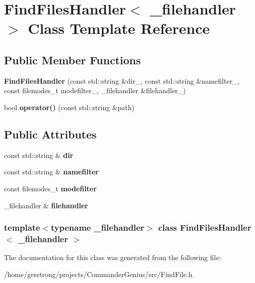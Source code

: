 \hypertarget{class_find_files_handler}{
\section{FindFilesHandler$<$ \_\-filehandler $>$ Class Template Reference}
\label{class_find_files_handler}
}
\subsection*{Public Member Functions}
\begin{DoxyCompactItemize}
\item 
\hypertarget{class_find_files_handler_a7b8a8be74f6e834fc7522d3ff1566f07}{
{\bfseries FindFilesHandler} (const std::string \&dir\_\-, const std::string \&namefilter\_\-, const filemodes\_\-t modefilter\_\-, \_\-filehandler \&filehandler\_\-)}
\label{class_find_files_handler_a7b8a8be74f6e834fc7522d3ff1566f07}

\item 
\hypertarget{class_find_files_handler_a3354edfd354582aa328558aadf3a48f6}{
bool {\bfseries operator()} (const std::string \&path)}
\label{class_find_files_handler_a3354edfd354582aa328558aadf3a48f6}

\end{DoxyCompactItemize}
\subsection*{Public Attributes}
\begin{DoxyCompactItemize}
\item 
\hypertarget{class_find_files_handler_a4730d8a32d0ef332ab6b9886067098c0}{
const std::string \& {\bfseries dir}}
\label{class_find_files_handler_a4730d8a32d0ef332ab6b9886067098c0}

\item 
\hypertarget{class_find_files_handler_ac2fd85d1af14dba424f73be5484e2511}{
const std::string \& {\bfseries namefilter}}
\label{class_find_files_handler_ac2fd85d1af14dba424f73be5484e2511}

\item 
\hypertarget{class_find_files_handler_a3aa2effd295e16c1c6ed970b895eb399}{
const filemodes\_\-t {\bfseries modefilter}}
\label{class_find_files_handler_a3aa2effd295e16c1c6ed970b895eb399}

\item 
\hypertarget{class_find_files_handler_a037f1bdcba9717c72fa2f7442c68c31b}{
\_\-filehandler \& {\bfseries filehandler}}
\label{class_find_files_handler_a037f1bdcba9717c72fa2f7442c68c31b}

\end{DoxyCompactItemize}
\subsubsection*{template$<$typename \_\-filehandler$>$ class FindFilesHandler$<$ \_\-filehandler $>$}



The documentation for this class was generated from the following file:\begin{DoxyCompactItemize}
\item 
/home/gerstrong/projects/CommanderGenius/src/FindFile.h\end{DoxyCompactItemize}
